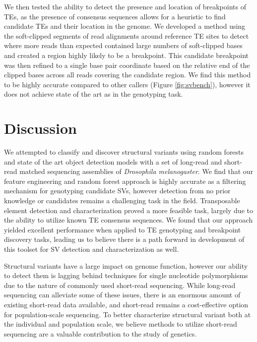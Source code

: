 We then tested the ability to detect the presence and location of breakpoints of TEs, as the presence of consensus sequences allows for a heuristic to find candidate TEs and their location in the genome. We developed a method using the soft-clipped segments of read alignments around reference TE sites to detect where more reads than expected contained large numbers of soft-clipped bases and created a region highly likely to be a breakpoint. This candidate breakpoint was then refined to a single base pair coordinate based on the relative end of the clipped bases across all reads covering the candidate region. We find this method to be highly accurate compared to other callers (Figure \ref{fig:svbench}), however it does not achieve state of the art as in the genotyping task.

\section{Discussion}

We attempted to classify and discover structural variants using random forests and state of the art object detection models with a set of long-read and short-read matched sequencing assemblies of \textit{Drosophila melanogaster}. We find that our feature engineering and random forest approach is highly accurate as a filtering mechanism for genotyping candidate SVs, however detection from no prior knowledge or candidates remains a challenging task in the field. Transposable element detection and characterization proved a more feasible task, largely due to the ability to utilize known TE consensus sequences. We found that our approach yielded excellent performance when applied to TE genotyping and breakpoint discovery tasks, leading us to believe there is a path forward in development of this toolset for SV detection and characterization as well.

Structural variants have a large impact on genome function, however our ability to detect them is lagging behind techniques for single nucleotide polymorphisms due to the nature of commonly used short-read sequencing. While long-read sequencing can alleviate some of these issues, there is an enormous amount of existing short-read data available, and short-read remains a cost-effective option for population-scale sequencing. To better characterize structural variant both at the individual and population scale, we believe methods to utilize short-read sequencing are a valuable contribution to the study of genetics.


